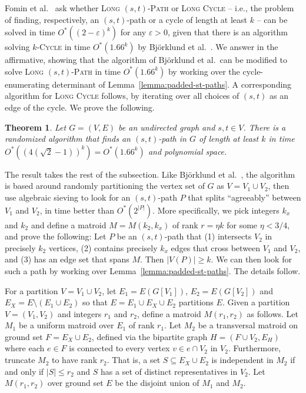 \documentclass[10pt,a4paper]{article}
\newtheorem{theorem}{Theorem}[section]
\begin{document}
Fomin et al.~\cite{FominGKSS24} ask whether \textsc{Long
  $(s,t)$-Path} or \textsc{Long Cycle} -- i.e., the problem of finding,
respectively, an $(s,t)$-path or a cycle of length at least $k$ -- can be
solved in time $O^*((2-\varepsilon)^k)$ for any $\varepsilon > 0$,
given that there is an algorithm solving \textsc{$k$-Cycle} in time
$O^*(1.66^k)$ by Bj\"orklund et al.~\cite{BjorklundHKK17narrow}.
We answer in the affirmative, showing that the algorithm of Bj\"orklund
et al.\ can be modified to solve \textsc{Long $(s,t)$-Path} in time
$O^*(1.66^k)$ by working over the cycle-enumerating determinant
of Lemma~\ref{lemma:padded-st-paths}. 
A corresponding algorithm for \textsc{Long Cycle} follows, by
iterating over all choices of $(s,t)$ as an edge of the cycle. 
We prove the following.

\begin{theorem} \label{theorem:long-path}
  Let $G=(V,E)$ be an undirected graph and $s, t \in V$.
  There is a randomized algorithm that finds an $(s,t)$-path in $G$ of length at
  least $k$ in time $O^*((4(\sqrt{2}-1))^k)=O^*(1.66^k)$ and polynomial space.
\end{theorem}

The result takes the rest of the subsection. Like Bj\"orklund et
al.~\cite{BjorklundHKK17narrow}, the algorithm is based around
randomly partitioning the vertex set of $G$ as $V=V_1 \cup V_2$,
then use algebraic sieving to look for an $(s,t)$-path $P$ that splits
``agreeably'' between $V_1$ and $V_2$, in time better than
$O^*(2^{|P|})$. More specifically, we pick integers $k_x$ and $k_2$
and define a matroid $M=M(k_2,k_x)$ of rank $r=\eta k$ for some $\eta < 3/4$, 
and prove the following: Let $P$ be an $(s,t)$-path that (1) intersects $V_2$ in
precisely $k_2$ vertices, (2) contains precisely $k_x$ edges that
cross between $V_1$ and $V_2$, and (3) has an edge set that spans $M$.
Then $|V(P)| \geq k$. We can then look for such a path
by working over Lemma~\ref{lemma:padded-st-paths}. The details follow.

For a partition $V=V_1 \cup V_2$, let $E_1=E(G[V_1])$,
$E_2=E(G[V_2])$ and $E_X=E \setminus (E_1 \cup E_2)$ so that
$E=E_1 \cup E_X \cup E_2$ partitions $E$. 
Given a partition $V=(V_1,V_2)$ and integers $r_1$ and $r_2$, 
define a matroid $M(r_1,r_2)$ as follows.
Let $M_1$ be a uniform matroid over $E_1$ of rank $r_1$.
Let $M_2$ be a transversal matroid on ground set $F=E_X \cup E_2$,
defined via the bipartite graph $H=(F \cup V_2, E_H)$
where each $e \in F$ is connected to every vertex $v \in e \cap V_2$ in $V_2$. 
Furthermore, truncate $M_2$ to have rank $r_2$. 
That is, a set $S \subseteq E_X \cup E_2$ is independent in $M_2$
if and only if $|S| \leq r_2$ and $S$ has a set of distinct
representatives in $V_2$. Let $M(r_1,r_2)$ over ground set $E$
be the disjoint union of $M_1$ and $M_2$.
\end{document}
